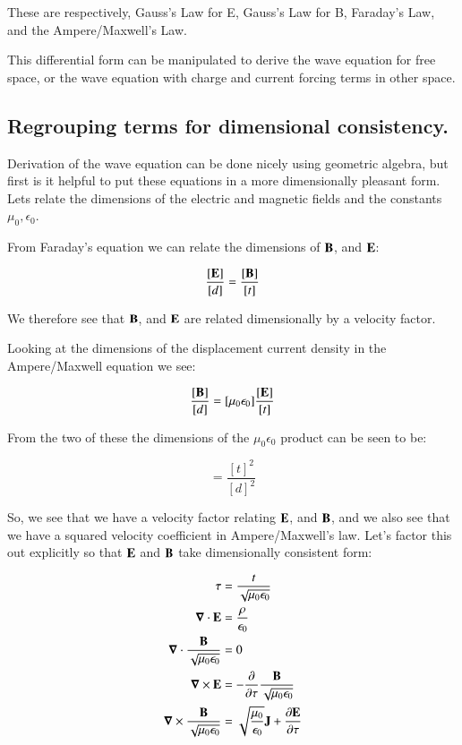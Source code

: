 \documentclass{article}      %
\newcommand{\spacegrad}[0]{\boldsymbol{\nabla}}
\begin{document}
These are respectively, Gauss's Law for E, Gauss's Law for B, Faraday's Law, and the Ampere/Maxwell's Law.

This differential form can be manipulated to derive the wave equation for free space, or the wave equation with charge and current forcing terms in other space.

\subsection{ Regrouping terms for dimensional consistency. }

Derivation of the wave equation can be done nicely using geometric algebra, but first is it helpful to put these equations in a more dimensionally pleasant form.
Lets relate the dimensions of the electric and magnetic fields and the constants $\mu_0, \epsilon_0$.

From Faraday's equation we can relate the dimensions of
$\mathbf{B}$, and $\mathbf{E}$:

\begin{equation}
\frac{[\mathbf{E}]}{[d]} = \frac{[\mathbf{B}]}{[t]}
\end{equation}

We therefore see that $\mathbf{B}$, and $\mathbf{E}$ are related dimensionally by a velocity factor.

Looking at the dimensions of the displacement current density in the Ampere/Maxwell equation we see:

\begin{equation}
\frac{[\mathbf{B}]}{[d]} = [\mu_0\epsilon_0] \frac{[\mathbf{E}]}{[t]}
\end{equation}

From the two of these the dimensions of the $\mu_0\epsilon_0$ product can be seen to be:

\begin{equation}
[\mu_0\epsilon_0] = \frac{{[t]}^2}{{[d]}^2}
\end{equation}

So, we see that we have a velocity factor relating $\mathbf{E}$, and $\mathbf{B}$, and we also see that we have a squared velocity coefficient in Ampere/Maxwell's law.  Let's factor this out explicitly so that $\mathbf{E}$ and $\mathbf{B}$ take dimensionally consistent form:

\begin{align}
\tau &= \frac{t}{\sqrt{\mu_0\epsilon_0}}  \\
\spacegrad \cdot \BE &= \frac{\rho}{\epsilon_0} \\
\spacegrad \cdot \frac{\BB}{\sqrt{\mu_0\epsilon_0}} &= 0 \\
\spacegrad \cross \BE &= - \frac{\partial}{\partial \tau} \frac{\BB}{\sqrt{\mu_0\epsilon_0}} \\
\spacegrad \cross \frac{\BB}{\sqrt{\mu_0\epsilon_0}} &= \sqrt{\frac{\mu_0}{\epsilon_0}} \BJ + \frac{\partial \BE}{\partial \tau}
\end{align}
\end{document}
